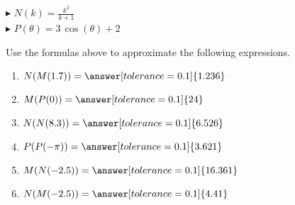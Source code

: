 \documentclass{ximera}
\begin{document}
$\blacktriangleright$ $N(k) = \frac{k^2}{k + 1}$ \\

$\blacktriangleright$ $P(\theta) = 3 \, \cos(\theta) + 2$










\begin{question}


Use the formulas above to approximate the following expressions.



\begin{enumerate}

\item $N(M(1.7)) = \answer[tolerance=0.1]{1.236}$ \\

\item $M(P(0)) = \answer[tolerance=0.1]{24}$ \\

\item $N(N(8.3)) = \answer[tolerance=0.1]{6.526}$ \\

\item $P(P(-\pi)) = \answer[tolerance=0.1]{3.621}$ \\

\item $M(N(-2.5)) = \answer[tolerance=0.1]{16.361}$ \\

\item $N(M(-2.5)) = \answer[tolerance=0.1]{4.41}$ \\

\end{enumerate}



\end{question}
\end{document}
